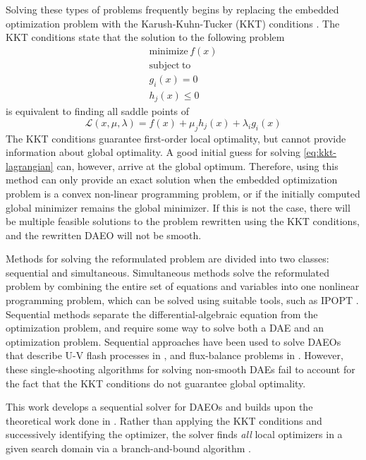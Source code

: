 \documentclass[twoside,leqno, twocolumn]{article}
\begin{document}
Solving these types of problems frequently begins by replacing the embedded optimization problem with the Karush-Kuhn-Tucker (KKT) conditions \cite{bieglerNonlinearProgrammingConcepts2010}. The KKT conditions state that the solution to the following problem
\begin{equation*}
	\begin{gathered}
		\mathrm{minimize}\,f(x) \\
		\mathrm{subject\ to} \\
		g_i(x) = 0\\
		h_j(x) \leq 0
	\end{gathered}
\end{equation*}
is equivalent to finding all saddle points of
\begin{equation}
	\label{eq:kkt-lagrangian}
	\mathcal{L}(x, \mu, \lambda) = f(x) + \mu_jh_j(x) + \lambda_ig_i(x)
\end{equation}
The KKT conditions guarantee first-order local optimality, but cannot provide information about global optimality. A good initial guess for solving \eqref{eq:kkt-lagrangian} can, however, arrive at the global optimum. Therefore, using this method can only provide an exact solution when the embedded optimization problem is a convex non-linear programming problem, or if the initially computed global minimizer remains the global minimizer. If this is not the case, there will be multiple feasible solutions to the problem rewritten using the KKT conditions, and the rewritten DAEO will not be smooth\cite{plochDirectSingleShooting2022}. 

Methods for solving the reformulated problem are divided into two classes: sequential and simultaneous. Simultaneous methods solve the reformulated problem by combining the entire set of equations and variables into one nonlinear programming problem, which can be solved using suitable tools, such as IPOPT \cite{bieglerNonlinearProgrammingConcepts2010, wachterImplementationInteriorpointFilter2006}. Sequential methods separate the differential-algebraic equation from the optimization problem, and require some way to solve both a DAE and an optimization problem. Sequential approaches have been used to solve DAEOs that describe U-V flash processes in \cite{ritschelAlgorithmGradientbasedDynamic2018}, and flux-balance problems in \cite{plochDirectSingleShooting2022}. However, these single-shooting algorithms for solving non-smooth DAEs fail to account for the fact that the KKT conditions do not guarantee global optimality.

This work develops a sequential solver for DAEOs and builds upon the theoretical work done in \cite{deussenNumericalSimulationDifferentialalgebraic2023}. Rather than applying the KKT conditions and successively identifying the optimizer, the solver finds \textit{all} local optimizers in a given search domain via a branch-and-bound algorithm \cite{rallGlobalOptimizationUsing1985}.
\end{document}
